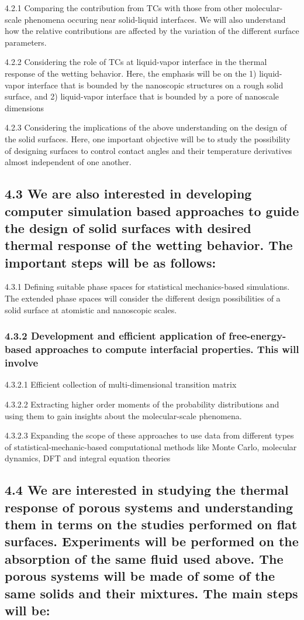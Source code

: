 \par 4.2.1 Comparing the contribution from TCs with those from other molecular-scale phenomena occuring near solid-liquid interfaces. We will also understand how the relative contributions are affected by the variation of the different surface parameters.
\par 4.2.2 Considering the role of TCs at liquid-vapor interface in the thermal response of the wetting behavior. Here, the emphasis will be on the 1) liquid-vapor interface that is bounded by the nanoscopic structures on a rough solid surface, and 2) liquid-vapor interface that is bounded by a pore of nanoscale dimensions
\par 4.2.3 Considering the implications of the above understanding on the design of the solid surfaces. Here, one important objective will be to study the possibility of designing surfaces to control contact angles and their temperature derivatives almost independent of one another.\subsection{4.3 We are also interested in developing computer simulation based approaches to guide the design of solid surfaces with desired thermal response of the wetting behavior. The important steps will be as follows:}

\par 4.3.1 Defining suitable phase spaces for statistical mechanics-based simulations. The extended phase spaces will consider the different design possibilities of a solid surface at atomistic and nanoscopic scales.\subsubsection{4.3.2 Development and efficient application of free-energy-based approaches to compute interfacial properties. This will involve}

\par 4.3.2.1 Efficient collection of multi-dimensional transition matrix
\par 4.3.2.2 Extracting higher order moments of the probability distributions and using them to gain insights about the molecular-scale phenomena.
\par 4.3.2.3 Expanding the scope of these approaches to use data from different types of statistical-mechanic-based computational methods like Monte Carlo, molecular dynamics, DFT and integral equation theories\subsection{4.4 We are interested in studying the thermal response of porous systems and understanding them in terms on the studies performed on flat surfaces. Experiments will be performed on the absorption of the same fluid used above. The porous systems will be made of some of the same solids and their mixtures. The main steps will be:}

